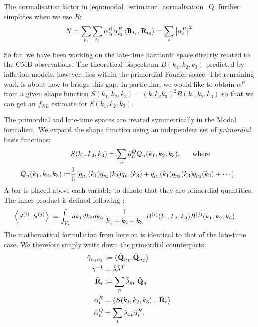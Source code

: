 The normalisation factor in \eqref{eqn:modal_estimator_normalisation_Q} further simplifies when we use $R$;
\begin{align}
	N = \sum_{t_1} \sum_{t_2} \alpha^R_{t_1} \alpha^R_{t_2} \left< \mathbf{R}_{t_1}, \mathbf{R}_{t_2} \right> = \sum_t \left| \alpha^R_{t} \right|^2 \label{eqn:modal_estimator_normalisation_R}
\end{align}

\hspace{10pt}

So far, we have been working on the late-time harmonic space directly related to the CMB observations. The theoretical bispectrum $B(k_1,k_2,k_3)$ predicted by inflation models, however, lies within the primordial Fourier space. The remaining work is about how to bridge this gap. In particular, we would like to obtain $\alpha^R$ from a given shape function $S(k_1,k_2,k_3) = (k_1 k_2 k_3)^2 B(k_1, k_2, k_3)$ so that we can get an $f_{NL}$ estimate for $S(k_1,k_2,k_3)$.

The primordial and late-time spaces are treated symmetrically in the Modal formalism. We expand the shape function using an independent set of \textit{primordial} basis functions;
\begin{align}
	&S(k_1,k_2,k_3) = \sum_n \bar{\alpha}^{\bar{Q}}_n \bar{Q}_n (k_1, k_2, k_3), \hspace{0.05\textwidth} \text{where}\\
	\bar{Q}_{n} (k_1, k_2, k_3) := &\frac{1}{6} \left[ \bar{q}_{p_1}(k_1) \bar{q}_{p_2}(k_2) \bar{q}_{p_3}(k_3) + \bar{q}_{p_1}(k_1) \bar{q}_{p_2}(k_3) \bar{q}_{p_3}(k_2) + \cdots \right].
\end{align}
A bar is placed above each variable to denote that they are primordial quantities. The inner product is defined following \cite{Fergusson2010general};
\begin{align}
	\left< S^{(i)}, S^{(j)} \right> &:= \int_{V_\mathbf{k}} dk_1 dk_2 dk_3 \; \frac{1}{k_1+k_2+k_3} \; B^{(i)}(k_1, k_2, k_3) B^{(j)}(k_1, k_2, k_3).
\end{align}
The mathematical formulation from here on is identical to that of the late-time case. We therefore simply write down the primordial counterparts;
\begin{align}
	\bar{\gamma}_{n_1 n_2} &:=  \left< \bar{\mathbf{Q}}_{n_1} , \bar{\mathbf{Q}}_{n_2} \right> \\
	\bar{\gamma}^{-1} &= \bar{\lambda} \bar{\lambda}^T \\
	\bar{\mathbf{R}}_t &:= \sum_n \bar{\lambda}_{nt} \; \bar{\mathbf{Q}}_{n} \\
	\bar{\alpha}^{\bar{R}}_t &= \left< S(k_1,k_2,k_3) \;,\; \bar{\mathbf{R}}_t \right> \\
	\bar{\alpha}^{\bar{Q}}_n &= \sum_t \bar{\lambda}_{nt} \bar{\alpha}^{\bar{R}}_t.
\end{align}

